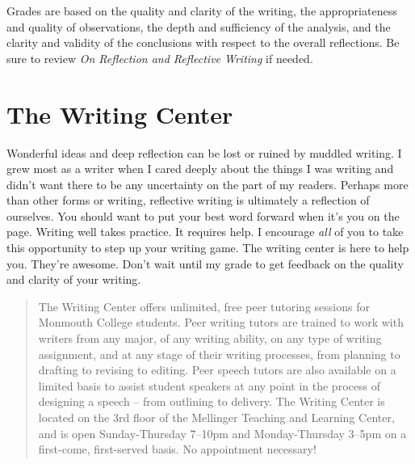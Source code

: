 \documentclass[nobib]{tufte-handout}
\begin{document}
Grades are based on the quality and clarity of the writing, the appropriateness and quality of observations, the depth and sufficiency of the analysis, and the clarity and validity of the conclusions with respect to the overall reflections. Be sure to review \textit{On Reflection and Reflective Writing} if needed.

\section{The Writing Center}

Wonderful ideas and deep reflection can be lost or ruined by muddled writing.  I grew most as a writer when I cared deeply about the things I was writing and didn't want there to be any uncertainty on the part of my readers. Perhaps more than other forms or writing, reflective writing is ultimately a reflection of ourselves. You should want to put your best word forward when it's you on the page. Writing well takes practice. It requires help. I encourage \textit{all} of you to take this opportunity to step up your writing game. The writing center is here to help you. They're awesome. Don't wait until my grade to get feedback on the quality and clarity of your writing.
\begin{quote}
  The Writing Center offers unlimited, free peer tutoring sessions for Monmouth College students.  Peer writing tutors are trained to work with writers from any major, of any writing ability, on any type of writing assignment, and at any stage of their writing processes, from planning to drafting to revising to editing.  Peer speech tutors are also available on a limited basis to assist student speakers at any point in the process of designing a speech – from outlining to delivery.  The Writing Center is  located on the 3rd floor of the Mellinger Teaching and Learning Center, and is open Sunday-Thursday 7--10pm and Monday-Thursday 3--5pm on a first-come, first-served basis.  No appointment necessary!
\end{quote}
\end{document}
